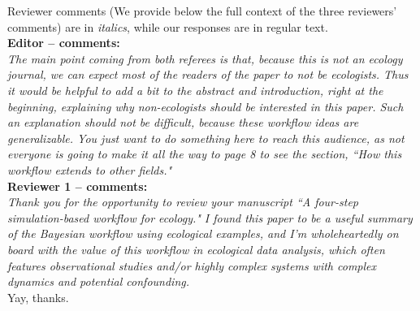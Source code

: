 \documentclass[11pt,a4paper]{article}
\begin{document}
%


Reviewer comments (We provide below the full context of the three reviewers' comments) are in \emph{italics}, while our responses are in regular text. \\

{\bf Editor -- comments:} \\

\emph{The main point coming from both referees is that, because this is not an ecology journal, we can expect most of the readers of the paper to not be ecologists. Thus it would be helpful to add a bit to the abstract and introduction, right at the beginning, explaining why non-ecologists should be interested in this paper. Such an explanation should not be difficult, because these workflow ideas are generalizable. You just want to do something here to reach this audience, as not everyone is going to make it all the way to page 8 to see the section, ``How this workflow extends to other fields."}\\

{\bf Reviewer 1 -- comments:} \\
\emph{Thank you for the opportunity to review your manuscript ``A four-step simulation-based workflow for ecology." I found this paper to be a useful summary of the Bayesian workflow using ecological examples, and I'm wholeheartedly on board with the value of this workflow in ecological data analysis, which often features observational studies and/or highly complex systems with complex dynamics and potential confounding.}\\

Yay, thanks. \\
\end{document}

